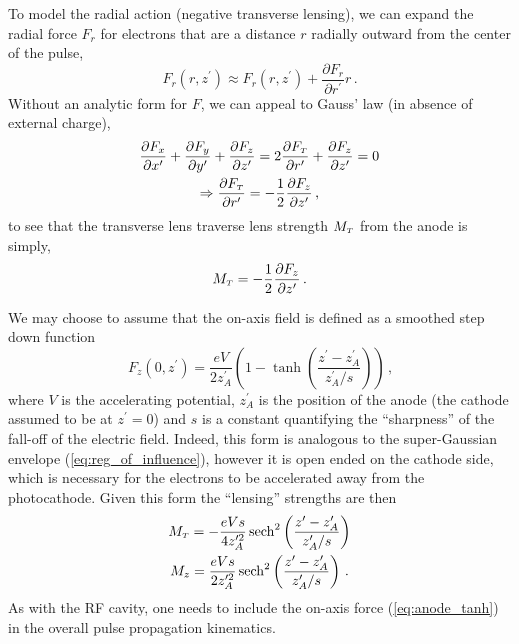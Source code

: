 To model the radial action (negative transverse lensing), we can expand the radial force $F_r$ for electrons that are a distance $r$ radially outward from the center of the pulse,
\begin{equation}
  F_r(r,z^{\prime}) \approx F_r(r,z^{\prime}) + \frac{\partial F_r}{\partial r^{\prime}} r \,\text{.}
\end{equation}
Without an analytic form for $F$, we can appeal to Gauss' law (in absence of external charge),
\begin{gather}
  \frac{\partial F_x}{\partial x^{\prime}} + \frac{\partial F_y}{\partial y^{\prime}} + \frac{\partial F_z}{\partial z^{\prime}} = 2 \frac{\partial F_{{\scriptscriptstyle T}}}{\partial r^{\prime}} + \frac{\partial F_z}{\partial z^{\prime}} = 0 \\
  \Rightarrow \frac{\partial F_{{\scriptscriptstyle T}}}{\partial r^{\prime}} = - \frac{1}{2} \frac{\partial F_z}{\partial z^{\prime}} \,\text{,}
\end{gather} 
to see that the transverse lens traverse lens strength $M_{{\scriptscriptstyle T}}$ from the anode is simply,
\begin{equation}
  M_{{\scriptscriptstyle T}} = -\frac{1}{2}\frac{\partial F_z}{\partial z^{\prime}} \, \text{.}
\end{equation}

We may choose to assume that the on-axis field is defined as a smoothed step down function
\begin{equation} \label{eq:anode_tanh}
  F_z(0,z^{\prime}) = \frac{eV}{2z^{\prime}_A} \left( 1 - \tanh \left( \frac{ z^{\prime} - z^{\prime}_A }{ z^{\prime}_A / s } \right) \right) \,\text{,}
\end{equation}
where $V$ is the accelerating potential, $z^{\prime}_A$ is the position of the anode (the cathode assumed to be at $z^{\prime} = 0$) and $s$ is a constant quantifying the ``sharpness'' of the fall-off of the electric field.
Indeed, this form is analogous to the super-Gaussian envelope (\ref{eq:reg_of_influence}), however it is open ended on the cathode side, which is necessary for the electrons to be accelerated away from the photocathode.
Given this form the ``lensing'' strengths are then
\begin{gather}
  M_{{\scriptscriptstyle T}} = -\frac{eVs}{4z^{\prime 2}_A} \operatorname{sech}^2 \left( \frac{z^{\prime} - z^{\prime}_A }{ z^{\prime}_A / s } \right) \\
  M_z = \frac{eVs}{2z^{\prime 2}_A} \operatorname{sech}^2 \left( \frac{z^{\prime} - z^{\prime}_A }{ z^{\prime}_A / s } \right) \, \text{.}
\end{gather}
As with the RF cavity, one needs to include the on-axis force (\ref{eq:anode_tanh}) in the overall pulse propagation kinematics.

